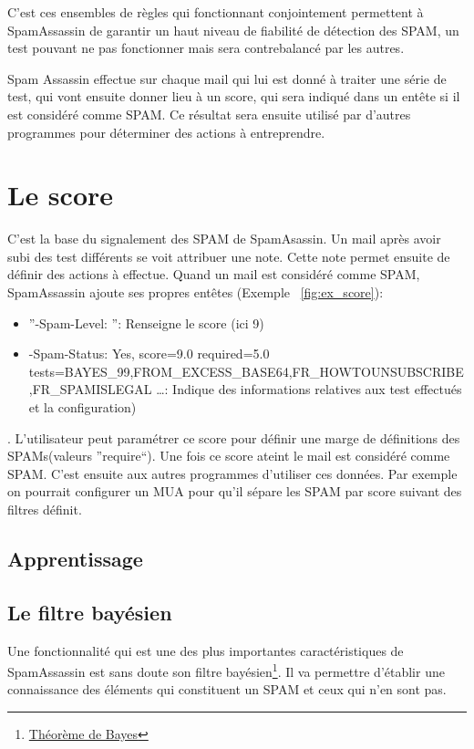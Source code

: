 \documentclass[a4paper,11pt]{article}
\begin{document}
\begin{description}
C'est ces ensembles de règles qui fonctionnant conjointement permettent à SpamAssassin de garantir un haut 
niveau de fiabilité de détection des SPAM, un test pouvant ne pas fonctionner mais sera contrebalancé par les autres.
 \end{description} 


Spam Assassin effectue sur chaque mail qui lui est donné à traiter une série de test, qui vont ensuite donner lieu à un score, qui sera indiqué dans un entête 
si il est considéré comme SPAM. 
Ce résultat sera ensuite utilisé par d'autres programmes pour déterminer des actions à entreprendre.


\section{Le score} \label{score}
C'est la base du signalement des SPAM de SpamAsassin. Un mail après avoir subi des test différents se voit attribuer une note. Cette note permet
ensuite de définir des actions à effectue. Quand un mail est considéré comme SPAM, SpamAssassin ajoute ses propres entêtes (Exemple ~\ref{fig:ex_score}):
\begin{itemize}
 \item ''-Spam-Level: \*\*\*\*\*\*\*\*\* '': Renseigne le score (ici 9)
 \item -Spam-Status: Yes, score=9.0 required=5.0 tests=BAYES\_99,FROM\_EXCESS\_BASE64,FR\_HOWTOUNSUBSCRIBE,FR\_SPAMISLEGAL \dots : Indique des informations relatives aux test effectués et la configuration)
\end{itemize}
. L'utilisateur peut paramétrer ce score pour définir une marge de définitions des SPAMs(valeurs ''require``). Une fois ce score ateint le mail est considéré comme SPAM.
C'est ensuite aux autres programmes d'utiliser ces données. Par exemple on pourrait configurer un MUA pour qu'il sépare 
les SPAM par score suivant des filtres définit. 

\label{baye}

\subsection{Apprentissage}

\subsection{Le filtre bayésien}

Une fonctionnalité qui est une des plus importantes caractéristiques de SpamAssassin est sans doute son filtre
bayésien\footnote{\href {https://fr.wikipedia.org/wiki/Th\%C3\%A9or\%C3\%A8me\_de_Bayes}{Théorème de Bayes}}.
Il va permettre d'établir une connaissance des éléments qui constituent un SPAM et ceux qui n'en sont pas.
\end{document}
